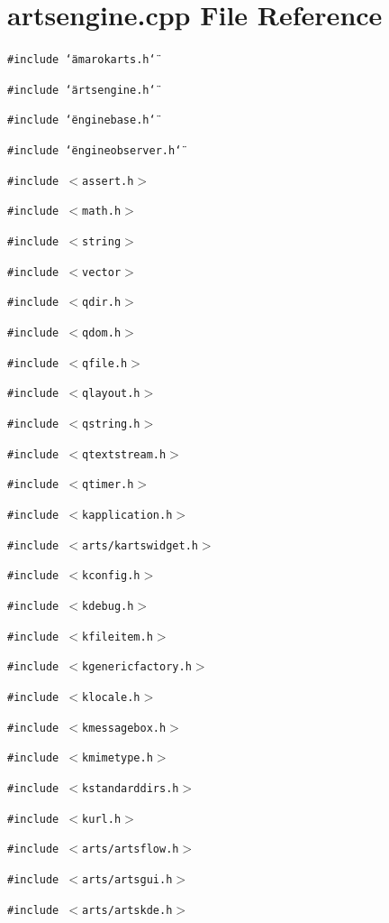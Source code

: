 \section{artsengine.cpp File Reference}
\label{artsengine_8cpp}


{\tt \#include \char`\"{}amarokarts.h\char`\"{}}\par
{\tt \#include \char`\"{}artsengine.h\char`\"{}}\par
{\tt \#include \char`\"{}enginebase.h\char`\"{}}\par
{\tt \#include \char`\"{}engineobserver.h\char`\"{}}\par
{\tt \#include $<$assert.h$>$}\par
{\tt \#include $<$math.h$>$}\par
{\tt \#include $<$string$>$}\par
{\tt \#include $<$vector$>$}\par
{\tt \#include $<$qdir.h$>$}\par
{\tt \#include $<$qdom.h$>$}\par
{\tt \#include $<$qfile.h$>$}\par
{\tt \#include $<$qlayout.h$>$}\par
{\tt \#include $<$qstring.h$>$}\par
{\tt \#include $<$qtextstream.h$>$}\par
{\tt \#include $<$qtimer.h$>$}\par
{\tt \#include $<$kapplication.h$>$}\par
{\tt \#include $<$arts/kartswidget.h$>$}\par
{\tt \#include $<$kconfig.h$>$}\par
{\tt \#include $<$kdebug.h$>$}\par
{\tt \#include $<$kfileitem.h$>$}\par
{\tt \#include $<$kgenericfactory.h$>$}\par
{\tt \#include $<$klocale.h$>$}\par
{\tt \#include $<$kmessagebox.h$>$}\par
{\tt \#include $<$kmimetype.h$>$}\par
{\tt \#include $<$kstandarddirs.h$>$}\par
{\tt \#include $<$kurl.h$>$}\par
{\tt \#include $<$arts/artsflow.h$>$}\par
{\tt \#include $<$arts/artsgui.h$>$}\par
{\tt \#include $<$arts/artskde.h$>$}\par
